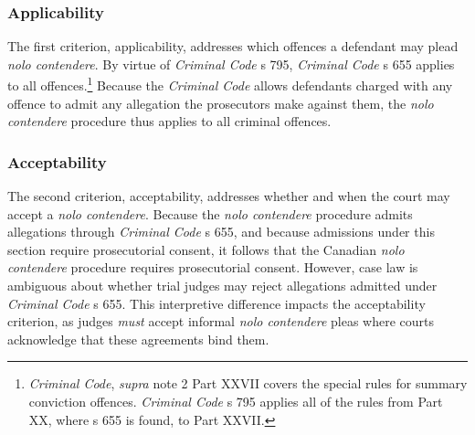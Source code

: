 \subsubsection{Applicability}

The first criterion, applicability, addresses which offences a defendant may plead \textit{nolo contendere}. By virtue of \textit{Criminal Code} s 795, \textit{Criminal Code} s 655 applies to all offences.\footnote{\textit{Criminal Code}, \textit{supra} note 2 Part XXVII covers the special rules for summary conviction offences. \textit{Criminal Code} s 795 applies all of the rules from Part XX, where s 655 is found, to Part XXVII.} Because the \textit{Criminal Code} allows defendants charged with any offence to admit any allegation the prosecutors make against them, the \textit{nolo contendere} procedure thus applies to all criminal offences.

\subsubsection{Acceptability}

The second criterion, acceptability, addresses whether and when the court may accept a \textit{nolo contendere}. Because the \textit{nolo contendere} procedure admits allegations through \textit{Criminal Code} s 655, and because admissions under this section require prosecutorial consent, it follows that the Canadian \textit{nolo contendere} procedure requires prosecutorial consent. However, case law is ambiguous about whether trial judges may reject allegations admitted under \textit{Criminal Code} s 655. This interpretive difference impacts the acceptability criterion, as judges \textit{must} accept informal \textit{nolo contendere} pleas where courts acknowledge that these agreements bind them. 

